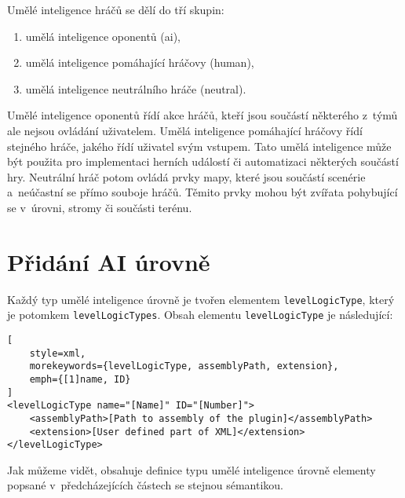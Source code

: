 Umělé inteligence hráčů se dělí do tří skupin:
\begin{enumerate}
	\item umělá inteligence oponentů (ai),
	\item umělá inteligence pomáhající hráčovy (human),
	\item umělá inteligence neutrálního hráče (neutral).
\end{enumerate}

Umělé inteligence oponentů řídí akce hráčů, kteří jsou součástí některého z~týmů ale nejsou ovládání uživatelem. Umělá inteligence pomáhající hráčovy řídí stejného hráče, jakého řídí uživatel svým vstupem. Tato umělá inteligence může být použita pro implementaci herních událostí či automatizaci některých součástí hry. Neutrální hráč potom ovládá prvky mapy, které jsou součástí scenérie a~neúčastní se přímo souboje hráčů. Těmito prvky mohou být zvířata pohybující se v~úrovni, stromy či součásti terénu. 

\section{Přidání AI úrovně}
Každý typ umělé inteligence úrovně je tvořen elementem \texttt{levelLogicType}, který je potomkem \texttt{levelLogicTypes}. Obsah elementu \texttt{levelLogicType} je následující:

\begin{lstlisting}[
	style=xml,
	morekeywords={levelLogicType, assemblyPath, extension},
	emph={[1]name, ID}
]
<levelLogicType name="[Name]" ID="[Number]">
	<assemblyPath>[Path to assembly of the plugin]</assemblyPath>
	<extension>[User defined part of XML]</extension>
</levelLogicType>
\end{lstlisting}
Jak můžeme vidět, obsahuje definice typu umělé inteligence úrovně elementy popsané v~předcházejících částech se stejnou sémantikou.

